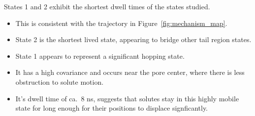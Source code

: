 \documentclass{article}
\begin{document}
  \noindent States 1 and 2 exhibit the shortest dwell times of the states studied.
  \begin{itemize}
      \item This is consistent with the trajectory in Figure~\ref{fig:mechanism_map}.
      \item State 2 is the shortest lived state, appearing to bridge other tail region
      states. 
      \item State 1 appears to represent a significant hopping state. 
      \item It has a high covariance and occurs near the pore center, where there is
      less obstruction to solute motion.
      \item It's dwell time of ca.~8 ns, suggests that solutes stay in this highly
      mobile state for long enough for their positions to displace signficantly.
  \end{itemize}
  
\end{document}
